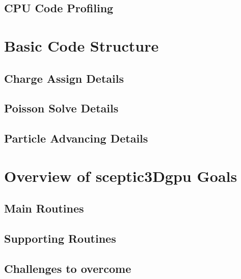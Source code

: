 	\subsection{CPU Code Profiling}

		\section{Basic Code Structure}

		
		\subsection{Charge Assign Details}
		
		\subsection{Poisson Solve Details}
		
		\subsection{Particle Advancing Details}
		

		

	\section{Overview of sceptic3Dgpu Goals}

		\subsection{Main Routines}

		\subsection{Supporting Routines}

		\subsection{Challenges to overcome}















